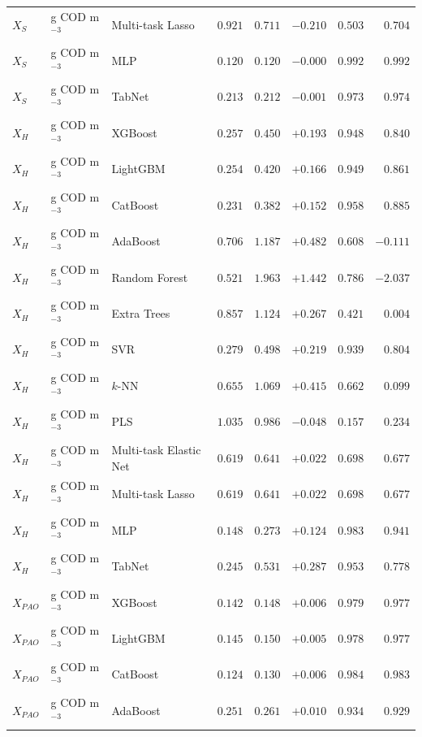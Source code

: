 \begin{longtable}{llp{3.1cm}rrrrr}
$X_{S}$ & g COD m$^{-3}$ & Multi-task Lasso & $0.921$ & $0.711$ & $-0.210$ & $0.503$ & $0.704$ \\
$X_{S}$ & g COD m$^{-3}$ & MLP & $0.120$ & $0.120$ & $-0.000$ & $0.992$ & $0.992$ \\
$X_{S}$ & g COD m$^{-3}$ & TabNet & $0.213$ & $0.212$ & $-0.001$ & $0.973$ & $0.974$ \\
$X_{H}$ & g COD m$^{-3}$ & XGBoost & $0.257$ & $0.450$ & $+0.193$ & $0.948$ & $0.840$ \\
$X_{H}$ & g COD m$^{-3}$ & LightGBM & $0.254$ & $0.420$ & $+0.166$ & $0.949$ & $0.861$ \\
$X_{H}$ & g COD m$^{-3}$ & CatBoost & $0.231$ & $0.382$ & $+0.152$ & $0.958$ & $0.885$ \\
$X_{H}$ & g COD m$^{-3}$ & AdaBoost & $0.706$ & $1.187$ & $+0.482$ & $0.608$ & $-0.111$ \\
$X_{H}$ & g COD m$^{-3}$ & Random Forest & $0.521$ & $1.963$ & $+1.442$ & $0.786$ & $-2.037$ \\
$X_{H}$ & g COD m$^{-3}$ & Extra Trees & $0.857$ & $1.124$ & $+0.267$ & $0.421$ & $0.004$ \\
$X_{H}$ & g COD m$^{-3}$ & SVR & $0.279$ & $0.498$ & $+0.219$ & $0.939$ & $0.804$ \\
$X_{H}$ & g COD m$^{-3}$ & $k$-NN & $0.655$ & $1.069$ & $+0.415$ & $0.662$ & $0.099$ \\
$X_{H}$ & g COD m$^{-3}$ & PLS & $1.035$ & $0.986$ & $-0.048$ & $0.157$ & $0.234$ \\
$X_{H}$ & g COD m$^{-3}$ & Multi-task Elastic Net & $0.619$ & $0.641$ & $+0.022$ & $0.698$ & $0.677$ \\
$X_{H}$ & g COD m$^{-3}$ & Multi-task Lasso & $0.619$ & $0.641$ & $+0.022$ & $0.698$ & $0.677$ \\
$X_{H}$ & g COD m$^{-3}$ & MLP & $0.148$ & $0.273$ & $+0.124$ & $0.983$ & $0.941$ \\
$X_{H}$ & g COD m$^{-3}$ & TabNet & $0.245$ & $0.531$ & $+0.287$ & $0.953$ & $0.778$ \\
$X_{PAO}$ & g COD m$^{-3}$ & XGBoost & $0.142$ & $0.148$ & $+0.006$ & $0.979$ & $0.977$ \\
$X_{PAO}$ & g COD m$^{-3}$ & LightGBM & $0.145$ & $0.150$ & $+0.005$ & $0.978$ & $0.977$ \\
$X_{PAO}$ & g COD m$^{-3}$ & CatBoost & $0.124$ & $0.130$ & $+0.006$ & $0.984$ & $0.983$ \\
$X_{PAO}$ & g COD m$^{-3}$ & AdaBoost & $0.251$ & $0.261$ & $+0.010$ & $0.934$ & $0.929$ \\

\end{longtable}
